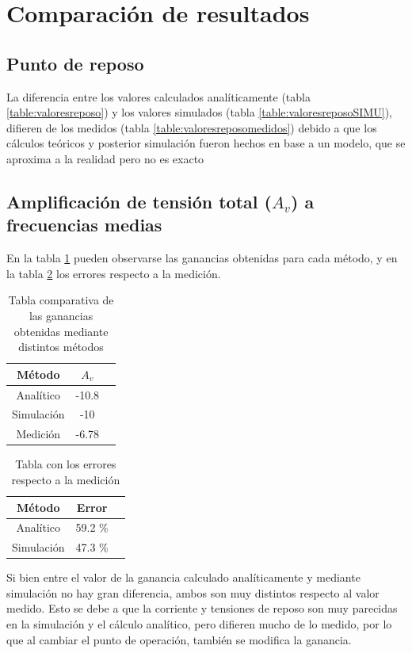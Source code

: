 \documentclass[10pt,spanish,a4paper,notitlepage]{article}
\begin{document}
\section{Comparación de resultados}

\subsection{Punto de reposo}
La diferencia entre los valores calculados analíticamente (tabla \ref{table:valoresreposo}) y los valores simulados (tabla \ref{table:valoresreposoSIMU}), difieren de los medidos (tabla \ref{table:valoresreposomedidos}) debido a que los cálculos teóricos y posterior simulación fueron hechos en base a un modelo, que se aproxima a la realidad pero no es exacto


\subsection{Amplificación de tensión total (\texorpdfstring{$A_v$}{TEXT}) a frecuencias medias}

En la tabla \ref{table:compganancias} pueden observarse las ganancias obtenidas para cada método, y en la tabla \ref{table:compgananciaserror} los errores respecto a la medición.

\begin{table}[H]
\centering
\begin{tabular}{|c|c|c|} 
\hline
Método & $A_{v}$  \\ \hline
Analítico & -10.8 \\ \hline
Simulación & -10 \\ \hline
Medición & -6.78\\ \hline
\end{tabular}
\caption{Tabla comparativa de las ganancias obtenidas mediante distintos métodos}
\label{table:compganancias}
\end{table}

\begin{table}[H]
\centering
\begin{tabular}{|c|c|c|} 
\hline
Método & Error \\ \hline
Analítico & 59.2 \%  \\ \hline
Simulación &  47.3 \% \\ \hline
\end{tabular}
\caption{Tabla con los errores respecto a la medición}
\label{table:compgananciaserror}
\end{table}

Si bien entre el valor de la ganancia calculado analíticamente y mediante simulación no hay gran diferencia, ambos son muy distintos respecto al valor medido. Esto se debe a que la corriente y tensiones de reposo son muy parecidas en la simulación y el cálculo analítico, pero difieren mucho de lo medido, por lo que al cambiar el punto de operación, también se modifica la ganancia.
\end{document}
